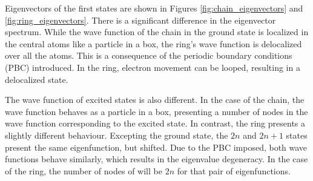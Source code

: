 \documentclass{article}
\begin{document}
Eigenvectors of the first states are shown in Figures \ref{fig:chain_eigenvectors} and \ref{fig:ring_eigenvectors}. There is a significant difference in the eigenvector spectrum. While the wave function of the chain in the ground state is localized in the central atoms like a particle in a box, the ring's wave function is delocalized over all the atoms. This is a consequence of the periodic boundary conditions (PBC) introduced. In the ring, electron movement can be looped, resulting in a delocalized state.

The wave function of excited states is also different. In the case of the chain, the wave function behaves as a particle in a box, presenting a number of nodes in the wave function corresponding to the excited state. In contrast, the ring presents a slightly different behaviour. Excepting the ground state, the $2n$ and $2n+1$ states present the same eigenfunction, but shifted. Due to the PBC imposed, both wave functions behave similarly, which results in the eigenvalue degeneracy. In the case of the ring, the number of nodes of will be $2n$ for that pair of eigenfunctions. 
\end{document}

